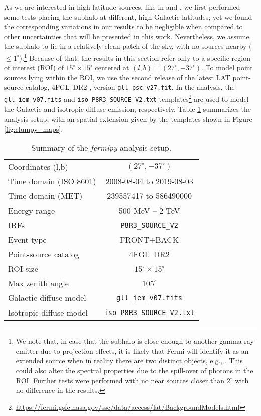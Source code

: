 \documentclass[%
 reprint,
nofootinbib,
 amsmath,amssymb,
 aps,
]{revtex4-2}
\begin{document}
As we are interested in high-latitude sources, like in  and , we first performed some tests placing the subhalo at different, high Galactic latitudes; yet we found the corresponding variations in our results to be negligible when compared to other uncertainties that will be presented in this work. Nevertheless, we assume the subhalo to lie in a relatively clean patch of the sky, with no sources nearby ($\leq 1^\circ$).\footnote{We note that, in case that the subhalo is close enough to another gamma-ray emitter due to projection effects, it is likely that Fermi will identify it as an extended source when in reality there are two distinct objects, e.g., \cite{2018PDU....21....1C}. This could also alter the spectral properties due to the spill-over of photons in the ROI. Further tests were performed with no near sources closer than $2^\circ$ with no difference in the results.} Because of that, the results in this section refer only to a specific region of interest (ROI) of $15^\circ \times 15^\circ$ centered at $(l,b)=(27^\circ,-37^\circ)$. To model point sources lying within the ROI, we use the second release of the latest LAT point-source catalog, 4FGL--DR2 \cite{Abdollahi2020, Ballet2020}, version \texttt{gll\_psc\_v27.fit}. In the analysis, the \texttt{gll\_iem\_v07.fits} and \texttt{iso\_P8R3\_SOURCE\_V2.txt} templates\footnote{\url{https://fermi.gsfc.nasa.gov/ssc/data/access/lat/BackgroundModels.html}} are used to model the Galactic and isotropic diffuse emission, respectively. Table \ref{tab:setup_summary} summarizes the analysis setup, with an spatial extension given by the templates shown in Figure \ref{fig:clumpy_maps}.

\begin{table}[h!]
\caption{Summary of the \textit{fermipy} analysis setup.}
\centering
\begin{tabular}{l c}
\hline
\hline
Coordinates (l,b) & $(27^\circ,-37^\circ)$\\
Time domain (ISO 8601) & 2008-08-04 to 2019-08-03\\
Time domain (MET) & 239557417 to 586490000\\
Energy range & 500 MeV -- 2 TeV\\
IRFs & \texttt{P8R3\_SOURCE\_V2}\\
Event type & FRONT+BACK\\
Point-source catalog & 4FGL--DR2\\
ROI size & $15^\circ \times 15^\circ$\\
Max zenith angle & $105^\circ$\\
Galactic diffuse model & \texttt{gll\_iem\_v07.fits}\\
Isotropic diffuse model & \texttt{iso\_P8R3\_SOURCE\_V2.txt}\\
\hline
\hline
\end{tabular}
\label{tab:setup_summary}
\end{table}
\end{document}
